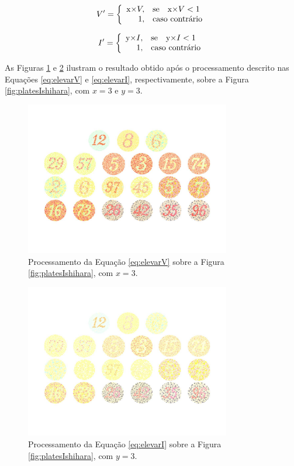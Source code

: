 \documentclass[	12pt, Times, openright, twoside, a4paper, english, brazil]{abntex2}
\begin{document}
\begin{equation}
\label{eq:elevarV}
V'=\left\{
\begin{array}{rl}
       $x$ \times V,&\mbox{se}\quad $x$ \times V < 1 \\
       1,&\mbox{caso contrário}
\end{array}\right.
\end{equation}

\begin{equation}
\label{eq:elevarI}
I'=\left\{
\begin{array}{rl}
       $y$ \times I,&\mbox{se}\quad $y$ \times I < 1 \\
       1,&\mbox{caso contrário}
\end{array}\right.
\end{equation}

As Figuras \ref{fig:figuraElevarV} e \ref{fig:figuraElevarI} ilustram o resultado obtido após o processamento descrito nas Equações \ref{eq:elevarV} e \ref{eq:elevarI}, respectivamente, sobre a Figura \ref{fig:platesIshihara}, com $x = 3$ e $y = 3$.

\begin{figure}[!htb]
\centering \includegraphics[width=0.80\textwidth]{figuraElevarV.jpg}
\caption{Processamento da Equação \ref{eq:elevarV} sobre a Figura \ref{fig:platesIshihara}, com $x = 3$. \label{fig:figuraElevarV}}
\end{figure}

\begin{figure}[!htb]
\centering \includegraphics[width=0.80\textwidth]{figuraElevarI.jpg}
\caption{Processamento da Equação \ref{eq:elevarI} sobre a Figura \ref{fig:platesIshihara}, com $y = 3$. \label{fig:figuraElevarI}}
\end{figure}
\end{document}

